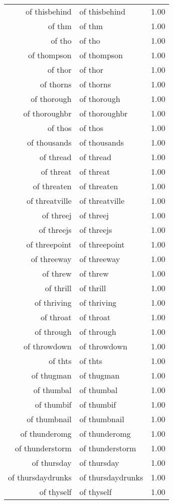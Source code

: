 \begin{table}[ht]
\begin{tabular}{rlr}
  of thisbehind & of thisbehind & 1.00 \\ 
  of thm & of thm & 1.00 \\ 
  of tho & of tho & 1.00 \\ 
  of thompson & of thompson & 1.00 \\ 
  of thor & of thor & 1.00 \\ 
  of thorns & of thorns & 1.00 \\ 
  of thorough & of thorough & 1.00 \\ 
  of thoroughbr & of thoroughbr & 1.00 \\ 
  of thos & of thos & 1.00 \\ 
  of thousands & of thousands & 1.00 \\ 
  of thread & of thread & 1.00 \\ 
  of threat & of threat & 1.00 \\ 
  of threaten & of threaten & 1.00 \\ 
  of threatville & of threatville & 1.00 \\ 
  of threej & of threej & 1.00 \\ 
  of threejs & of threejs & 1.00 \\ 
  of threepoint & of threepoint & 1.00 \\ 
  of threeway & of threeway & 1.00 \\ 
  of threw & of threw & 1.00 \\ 
  of thrill & of thrill & 1.00 \\ 
  of thriving & of thriving & 1.00 \\ 
  of throat & of throat & 1.00 \\ 
  of through & of through & 1.00 \\ 
  of throwdown & of throwdown & 1.00 \\ 
  of thts & of thts & 1.00 \\ 
  of thugman & of thugman & 1.00 \\ 
  of thumbal & of thumbal & 1.00 \\ 
  of thumbif & of thumbif & 1.00 \\ 
  of thumbnail & of thumbnail & 1.00 \\ 
  of thunderomg & of thunderomg & 1.00 \\ 
  of thunderstorm & of thunderstorm & 1.00 \\ 
  of thursday & of thursday & 1.00 \\ 
  of thursdaydrunks & of thursdaydrunks & 1.00 \\ 
  of thyself & of thyself & 1.00 \\ 

\end{tabular}
\end{table}
